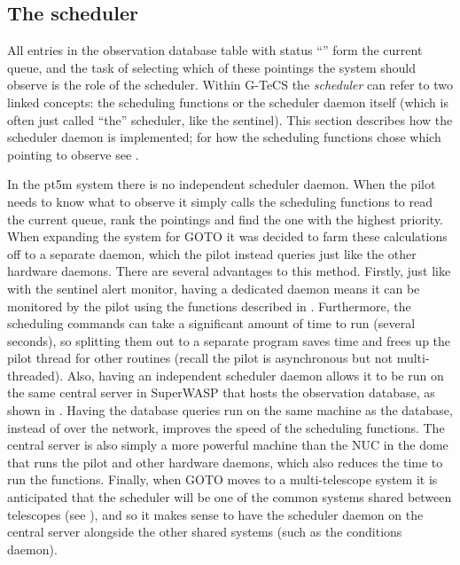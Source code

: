 \subsection{The scheduler}
\label{sec:scheduler}
\begin{colsection}

All entries in the observation database  table with status ``'' form the current queue, and the task of selecting which of these pointings the system should observe is the role of the scheduler. Within G-TeCS the \emph{scheduler} can refer to two linked concepts: the scheduling functions or the scheduler daemon itself (which is often just called ``the'' scheduler, like the sentinel). This section describes how the scheduler daemon is implemented; for how the scheduling functions chose which pointing to observe see .

In the pt5m system there is no independent scheduler daemon. When the pilot needs to know what to observe it simply calls the scheduling functions to read the current queue, rank the pointings and find the one with the highest priority. When expanding the system for GOTO it was decided to farm these calculations off to a separate daemon, which the pilot instead queries just like the other hardware daemons. There are several advantages to this method. Firstly, just like with the sentinel alert monitor, having a dedicated daemon means it can be monitored by the pilot using the functions described in . Furthermore, the scheduling commands can take a significant amount of time to run (several seconds), so splitting them out to a separate program saves time and frees up the pilot thread for other routines (recall the pilot is asynchronous but not multi-threaded). Also, having an independent scheduler daemon allows it to be run on the same central server in SuperWASP that hosts the observation database, as shown in . Having the  database queries run on the same machine as the database, instead of over the network, improves the speed of the scheduling functions. The central server is also simply a more powerful machine than the NUC in the dome that runs the pilot and other hardware daemons, which also reduces the time to run the functions. Finally, when GOTO moves to a multi-telescope system it is anticipated that the scheduler will be one of the common systems shared between telescopes (see ), and so it makes sense to have the scheduler daemon on the central server alongside the other shared systems (such as the conditions daemon).


\end{colsection}
